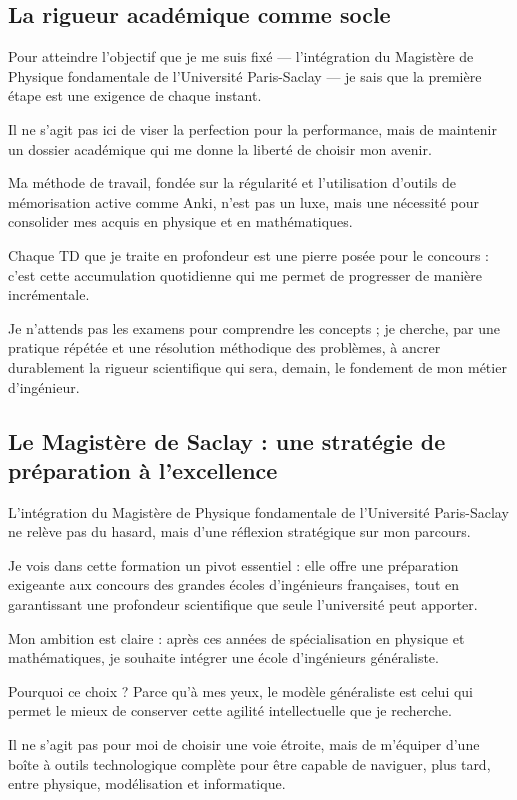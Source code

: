 \subsection{La rigueur académique comme socle}

Pour atteindre l'objectif que je me suis fixé — 
l'intégration du Magistère de Physique fondamentale de l'Université Paris-Saclay — 
je sais que la première étape est une exigence de chaque instant. 

Il ne s'agit pas ici de viser la perfection pour la performance, 
mais de maintenir un dossier académique qui me donne la liberté de choisir mon avenir. 

Ma méthode de travail, 
fondée sur la régularité et l'utilisation d'outils de mémorisation active comme Anki, 
n'est pas un luxe, mais une nécessité pour consolider mes acquis en physique et en mathématiques. 

Chaque TD que je traite en profondeur est une pierre posée pour le concours : 
c'est cette accumulation quotidienne qui me permet de progresser de manière incrémentale. 

Je n'attends pas les examens pour comprendre les concepts ; 
je cherche, par une pratique répétée et une résolution méthodique des problèmes, 
à ancrer durablement la rigueur scientifique qui sera, demain, 
le fondement de mon métier d'ingénieur.

\subsection{Le Magistère de Saclay : une stratégie de préparation à l'excellence}

L'intégration du Magistère de Physique fondamentale de l'Université Paris-Saclay 
ne relève pas du hasard, mais d'une réflexion stratégique sur mon parcours. 

Je vois dans cette formation un pivot essentiel : 
elle offre une préparation exigeante aux concours des grandes écoles d'ingénieurs françaises, 
tout en garantissant une profondeur scientifique que seule l'université peut apporter. 

Mon ambition est claire : 
après ces années de spécialisation en physique et mathématiques, 
je souhaite intégrer une école d'ingénieurs généraliste. 

Pourquoi ce choix ? 
Parce qu'à mes yeux, le modèle généraliste est celui qui permet le mieux 
de conserver cette agilité intellectuelle que je recherche. 

Il ne s'agit pas pour moi de choisir une voie étroite, 
mais de m'équiper d'une boîte à outils technologique complète 
pour être capable de naviguer, plus tard, entre physique, modélisation et informatique. 

